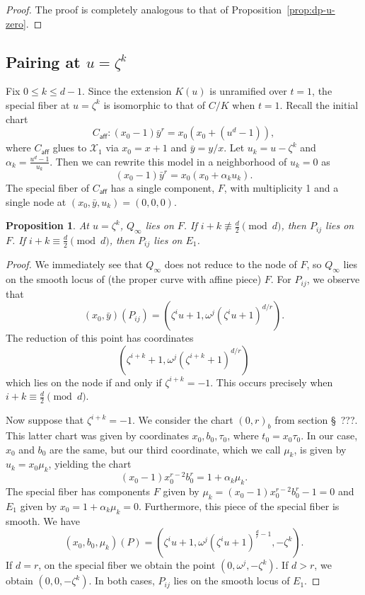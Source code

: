 \documentclass[reqno]{amsart}
\newtheorem{proposition}[thm]{Proposition}
\theoremstyle{definition}
\theoremstyle{remark}
\def\XX{\mathcal{X}}
\def\caff{C_{\textsf{aff}}}
\begin{document}
\begin{proof}
  The proof is completely analogous to that of Proposition~\ref{prop:dp-u-zero}.
\end{proof}

\subsection{Pairing at $u = \zeta^k$}
\label{sec:pairing-at-u-1}

Fix $0 \leq k \leq d-1$. Since the extension $K(u)$ is unramified over $t = 1$, the special fiber at $u = \zeta^k$ is isomorphic to that of $C/K$ when $t = 1$. Recall the initial chart 
\[
\caff: (x_0 - 1) \bar{y}^r = x_0(x_0 + (u^d - 1)),
\]
where $\caff$ glues to $\XX_1$ via $x_0 = x + 1$ and $\bar{y} = y/x$. Let $u_k = u - \zeta^k$ and $\alpha_k = \frac{u^d - 1}{u_k}$. Then we can rewrite this model in a neighborhood of $u_k = 0$ as
\[
(x_0 - 1) \bar{y}^r = x_0(x_0 + \alpha_ku_k).
\]
The special fiber of $\caff$ has a single component, $F$, with multiplicity 1 and a single node at $(x_0, \bar{y}, u_k) = (0,0,0)$.
\begin{proposition}\label{prop:points-on-components-u-zeta-k}
  At $u=\zeta^k$, $Q_\infty$ lies on $F$. If $i+k \not\equiv \frac{d}{2} \pmod{d}$, then $P_{ij}$ lies on $F$. If $i + k \equiv \frac{d}{2} \pmod{d}$, then $P_{ij}$ lies on $E_1$.
\end{proposition}

\begin{proof}
  We immediately see that $Q_\infty$ does not reduce to the node of $F$, so $Q_\infty$ lies on the smooth locus of (the proper curve with affine piece) $F$. For $P_{ij}$, we observe that
  \[
  (x_0, \bar{y})(P_{ij}) = (\zeta^i u + 1, \omega^j (\zeta^i u + 1)^{d/r}).
  \]
  The reduction of this point has coordinates
  \begin{equation}
    (\zeta^{i+k} + 1, \omega^j(\zeta^{i+k} + 1)^{d/r})\label{eq:pij-on-u-equals-zeta-k}
  \end{equation}
    which lies on the node if and only if $\zeta^{i+k} = -1$. This occurs precisely when $i + k \equiv \frac{d}{2} \pmod{d}$.

  Now suppose that $\zeta^{i+k} = -1$. We consider the chart $(0,r)_b$ from section \S~???. This latter chart was given by coordinates $x_0, b_0, \tau_0$, where $t_0 = x_0 \tau_0$. In our case, $x_0$ and $b_0$ are the same, but our third coordinate, which we call $\mu_k$, is given by $u_k = x_0 \mu_k$, yielding the chart
  \[
  (x_0 - 1)x_0^{r-2}b_0^r = 1 + \alpha_k \mu_k.
  \]
  The special fiber has components $F$ given by $\mu_k = (x_0 - 1)x_0^{r-2}b_0^r - 1 = 0$ and $E_1$ given by $x_0 = 1 + \alpha_k \mu_k = 0$. Furthermore, this piece of the special fiber is smooth. We have
  \[
  (x_0, b_0, \mu_k)(P) = (\zeta^iu + 1, \omega^j(\zeta^i u + 1)^{\frac{d}{r} - 1}, -\zeta^k).
  \]
  If $d = r$, on the special fiber we obtain the point $(0, \omega^j, -\zeta^k)$. If $d > r$, we obtain $(0, 0, -\zeta^k)$. In both cases, $P_{ij}$ lies on the smooth locus of $E_1$.
\end{proof}
\end{document}
